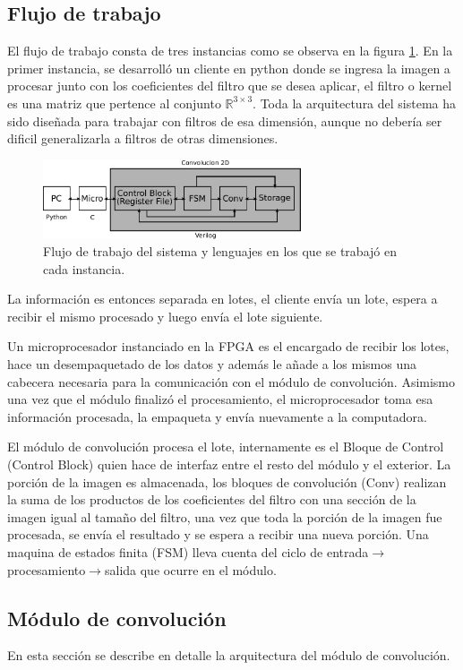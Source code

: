 \documentclass[conference,compsoc]{IEEEtran}
\begin{document}
\subsection{Flujo de trabajo}
El flujo de trabajo consta de tres instancias como se observa en la figura
\ref{fig_workflow}. En la primer instancia, se desarroll\'o un cliente en python
donde se ingresa la imagen a procesar junto con los coeficientes del filtro que
se desea aplicar, el filtro o kernel es una matriz que pertence al conjunto
$\mathbb{R}^{3{\times}3}$. Toda la arquitectura del sistema ha sido dise\~nada
para trabajar con filtros de esa dimensi\'on, aunque no deber\'ia ser dificil
generalizarla a filtros de otras dimensiones.
\begin{figure}[!t]
\centering
\includegraphics[width=3in]{workflow.pdf}
\caption{Flujo de trabajo del sistema y lenguajes en los que se trabaj\'o en
  cada instancia.}
\label{fig_workflow}
\end{figure}
La informaci\'on es entonces separada en lotes, el cliente env\'ia un
lote, espera a recibir el mismo procesado y luego env\'ia el lote siguiente.

Un microprocesador instanciado en la FPGA es el encargado de recibir los lotes,
hace un desempaquetado de los datos y adem\'as le a\~nade a los mismos una 
cabecera necesaria para la comunicaci\'on con el m\'odulo de convoluci\'on.
Asimismo una vez que el m\'odulo finaliz\'o el procesamiento, el microprocesador 
toma esa informaci\'on procesada, la empaqueta y env\'ia nuevamente a la
computadora.

El m\'odulo de convoluci\'on procesa el lote, internamente es el Bloque de
Control (Control Block) quien hace de interfaz entre el resto del m\'odulo y el
exterior. La porci\'on de la imagen es almacenada, los bloques de convoluci\'on
(Conv) realizan la suma de los productos de los coeficientes del filtro con una
secci\'on de la imagen igual al tama\~no del filtro, una vez que toda la
porci\'on de la imagen fue procesada, se env\'ia el resultado y se espera a
recibir una nueva porci\'on. Una maquina de estados finita (FSM) lleva cuenta
del ciclo de entrada$\rightarrow$procesamiento$\rightarrow$salida que ocurre en
el m\'odulo.

\subsection{M\'odulo de convoluci\'on}
En esta secci\'on se describe en detalle la arquitectura del m\'odulo de
convoluci\'on.
\end{document}
